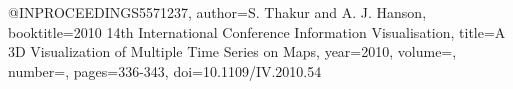 @INPROCEEDINGS{5571237,
  author={S. {Thakur} and A. J. {Hanson}},
  booktitle={2010 14th International Conference Information Visualisation}, 
  title={A 3D Visualization of Multiple Time Series on Maps}, 
  year={2010},
  volume={},
  number={},
  pages={336-343},
  doi={10.1109/IV.2010.54}}